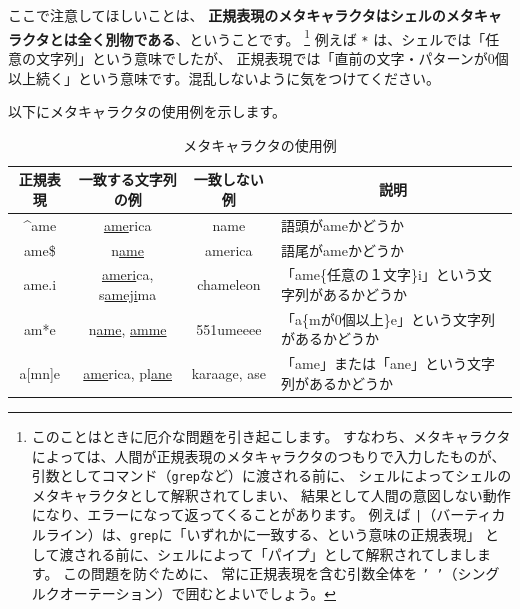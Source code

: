 \documentclass[a4j]{ltjreport}
\begin{document}
    ここで注意してほしいことは、
    \textbf{正規表現のメタキャラクタはシェルのメタキャラクタとは全く別物である}、ということです。
    \footnote{このことはときに厄介な問題を引き起こします。
    すなわち、メタキャラクタによっては、人間が正規表現のメタキャラクタのつもりで入力したものが、
    引数としてコマンド（\texttt{grep}など）に渡される前に、
    シェルによってシェルのメタキャラクタとして解釈されてしまい、
    結果として人間の意図しない動作になり、エラーになって返ってくることがあります。
    例えば \texttt{|}（バーティカルライン）は、\texttt{grep}に「いずれかに一致する、という意味の正規表現」
    として渡される前に、シェルによって「パイプ」として解釈されてしまします。
    この問題を防ぐために、
    常に正規表現を含む引数全体を \texttt{'\,'}（シングルクオーテーション）で囲むとよいでしょう。} 
    例えば \texttt{*} は、シェルでは「任意の文字列」という意味でしたが、
    正規表現では「直前の文字・パターンが0個以上続く」という意味です。混乱しないように気をつけてください。

    以下にメタキャラクタの使用例を示します。

    \begin{table}[h]
        \begin{center}
            \begin{tabular}{|c|c|c|l|}
                \hline
                \multicolumn{1}{|c|}{\textbf{正規表現}}&\multicolumn{1}{|c|}{\textbf{一致する文字列の例}}&\multicolumn{1}{|c|}{\textbf{一致しない例}}&\multicolumn{1}{|c|}{\textbf{説明}}\\
                \hline
                \textasciicircum ame & \underline{ame}rica &  name &語頭がameかどうか\\
                \hline
                ame\$ & n\underline{ame} & america &語尾がameかどうか\\
                \hline
                ame.i & \underline{ameri}ca, s\underline{ameji}ma & chameleon&「ame\{任意の１文字\}i」という文字列があるかどうか\\
                \hline
                am*e & n\underline{ame}, \underline{amme} &  551umeeee&「a\{mが0個以上\}e」という文字列があるかどうか\\
                \hline
                a[mn]e & \underline{ame}rica, pl\underline{ane} & karaage, ase &「ame」または「ane」という文字列があるかどうか\\
                \hline
            \end{tabular}
        \end{center}
        \caption{メタキャラクタの使用例}
    \end{table}
\end{document}
